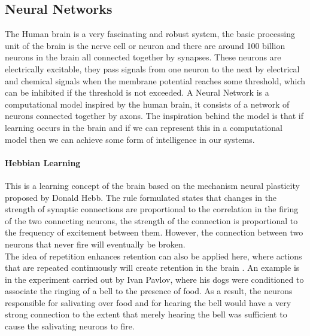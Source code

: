 \documentclass[a4paper,12pt]{report}
\begin{document}
		\subsection{Neural Networks}
		The Human brain is a very fascinating and robust system, the basic processing unit of the brain is the nerve cell or neuron and there are around 100 billion neurons in the brain all connected together by synapses. These neurons are electrically excitable, they pass signals from one neuron to the next by electrical and chemical signals when the membrane potential reaches some threshold, which can be inhibited if the threshold is not exceeded. A Neural Network is a computational model inspired by the human brain, it consists of a network of neurons connected together by axons. The inspiration behind the model is that if learning occurs in the brain and if we can represent this in a computational model then we can achieve some form of intelligence in our systems.
			\paragraph{Hebbian Learning}
			This is a learning concept of the brain based on the mechanism neural plasticity proposed by Donald Hebb. The rule formulated states that changes in the strength of synaptic connections are proportional to the correlation in the firing of the two connecting neurons, the strength of the connection is proportional to the frequency of excitement between them. However, the connection between two neurons that never fire will eventually be broken. \\
			The idea of repetition enhances retention can also be applied here, where actions that are repeated continuously will create retention in the brain \cite{Cunninghametal1984}. An example is in the experiment carried out by Ivan Pavlov, where his dogs were conditioned to associate the ringing of a bell to the presence of food. As a result, the neurons responsible for salivating over food and for hearing the bell would have a very strong connection to the extent that merely hearing the bell was sufficient to cause the salivating neurons to fire. 
\end{document}
